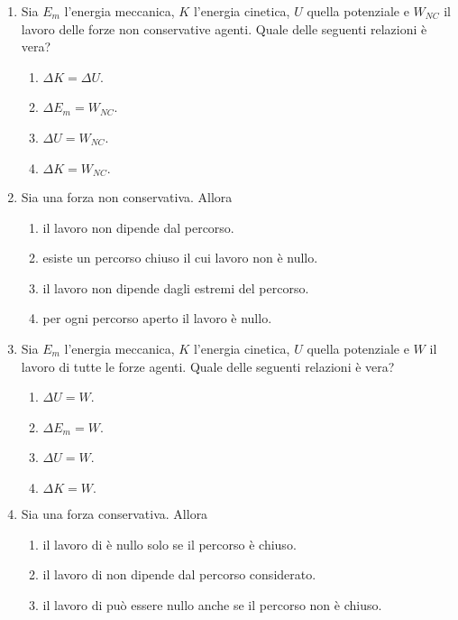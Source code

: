\documentclass{article}
\begin{document}
\begin{enumerate}
\begin{enumerate}[label=\Alph*.]
    \item $\frac{2v^2}{g\mu}}$.
    \item $\frac{1}{2}v^2+\mu g$.
    \item $\frac{v^2}{2g\mu}}$.
    \item $\frac{1}{2}v^2-\mu g$.
  \end{enumerate}
  \item Sia $E_m$ l'energia meccanica, $K$ l'energia cinetica, $U$ quella potenziale e $W_{NC}$ il lavoro delle forze non conservative agenti. Quale delle seguenti relazioni è vera?
  \begin{enumerate}[label=\Alph*.]
    \item $\Delta K = \Delta U$.
    \item $\Delta E_m=W_{NC}$.
    \item $\Delta U=W_{NC}$.
    \item $\Delta K=W_{NC}.$
  \end{enumerate}
  \item Sia  una forza non conservativa. Allora
  \begin{enumerate}[label=\Alph*.]
    \item il lavoro non dipende dal percorso.
    \item esiste un percorso chiuso il cui lavoro non è nullo.
    \item il lavoro non dipende dagli estremi del percorso.
    \item per ogni percorso aperto il lavoro è nullo.
  \end{enumerate}
  \item Sia $E_m$ l'energia meccanica, $K$ l'energia cinetica, $U$ quella potenziale e $W$ il lavoro di tutte le forze agenti. Quale delle seguenti relazioni è vera?
  \begin{enumerate}[label=\Alph*.]
    \item $\Delta U=W$.
    \item $\Delta E_m=W$.
    \item $\Delta U=W$.
    \item $\Delta K=W.$
  \end{enumerate}
  \item Sia  una forza conservativa. Allora
  \begin{enumerate}[label=\Alph*.]
    \item il lavoro di  è nullo solo se il percorso è chiuso.
    \item il lavoro di  non dipende dal percorso considerato.
    \item il lavoro di  può essere nullo anche se il percorso non è chiuso.

\end{enumerate}
\end{enumerate}
\end{document}
